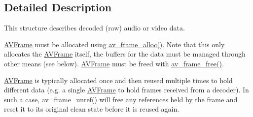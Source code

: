 

\subsection{Detailed Description}
This structure describes decoded (raw) audio or video data.

\hyperlink{struct_a_v_frame}{A\+V\+Frame} must be allocated using \hyperlink{group__lavu__frame_gac700017c5270c79c1e1befdeeb008b2f}{av\+\_\+frame\+\_\+alloc()}. Note that this only allocates the \hyperlink{struct_a_v_frame}{A\+V\+Frame} itself, the buffers for the data must be managed through other means (see below). \hyperlink{struct_a_v_frame}{A\+V\+Frame} must be freed with \hyperlink{group__lavu__frame_ga979d73f3228814aee56aeca0636e37cc}{av\+\_\+frame\+\_\+free()}.

\hyperlink{struct_a_v_frame}{A\+V\+Frame} is typically allocated once and then reused multiple times to hold different data (e.\+g. a single \hyperlink{struct_a_v_frame}{A\+V\+Frame} to hold frames received from a decoder). In such a case, \hyperlink{group__lavu__frame_ga0a2b687f9c1c5ed0089b01fd61227108}{av\+\_\+frame\+\_\+unref()} will free any references held by the frame and reset it to its original clean state before it is reused again.

